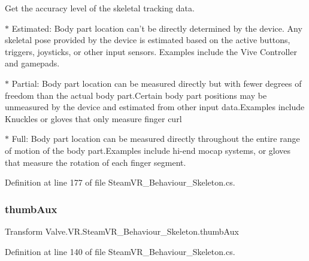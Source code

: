 Get the accuracy level of the skeletal tracking data. 

$\ast$ Estimated\+: Body part location can’t be directly determined by the device. Any skeletal pose provided by the device is estimated based on the active buttons, triggers, joysticks, or other input sensors. Examples include the Vive Controller and gamepads. 

$\ast$ Partial\+: Body part location can be measured directly but with fewer degrees of freedom than the actual body part.\+Certain body part positions may be unmeasured by the device and estimated from other input data.\+Examples include Knuckles or gloves that only measure finger curl 

$\ast$ Full\+: Body part location can be measured directly throughout the entire range of motion of the body part.\+Examples include hi-\/end mocap systems, or gloves that measure the rotation of each finger segment. 



Definition at line 177 of file Steam\+V\+R\+\_\+\+Behaviour\+\_\+\+Skeleton.\+cs.

\mbox{\label{class_valve_1_1_v_r_1_1_steam_v_r___behaviour___skeleton_a8cf7a616530313d0468173493a6ccbaf}} 
\subsubsection{\texorpdfstring{thumbAux}{thumbAux}}
{\footnotesize\ttfamily Transform Valve.\+V\+R.\+Steam\+V\+R\+\_\+\+Behaviour\+\_\+\+Skeleton.\+thumb\+Aux\hspace{0.3cm}{\ttfamily [get]}}



Definition at line 140 of file Steam\+V\+R\+\_\+\+Behaviour\+\_\+\+Skeleton.\+cs.

\mbox{\label{class_valve_1_1_v_r_1_1_steam_v_r___behaviour___skeleton_afdbc5c720567f8a20acb030108d59efa}} 
